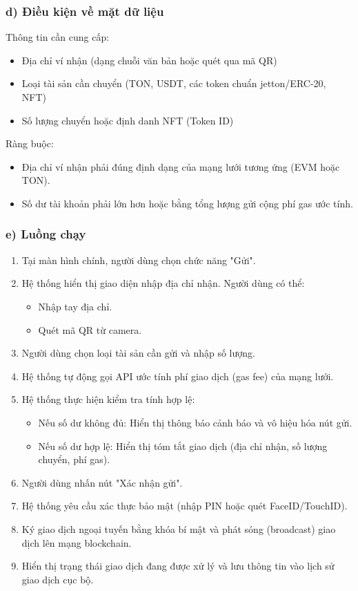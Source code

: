 \documentclass[a4paper]{report}
\begin{document}
\subsubsection{d) Điều kiện về mặt dữ liệu}
Thông tin cần cung cấp:
\begin{itemize}
    \item Địa chỉ ví nhận (dạng chuỗi văn bản hoặc quét qua mã QR)
    \item Loại tài sản cần chuyển (TON, USDT, các token chuẩn jetton/ERC-20, NFT)
    \item Số lượng chuyển hoặc định danh NFT (Token ID)
\end{itemize}

Ràng buộc:
\begin{itemize}
    \item Địa chỉ ví nhận phải đúng định dạng của mạng lưới tương ứng (EVM hoặc TON).
    \item Số dư tài khoản phải lớn hơn hoặc bằng tổng lượng gửi cộng phí gas ước tính.
\end{itemize}

\subsubsection{e) Luồng chạy}
\begin{enumerate}
    \item Tại màn hình chính, người dùng chọn chức năng "Gửi".
    \item Hệ thống hiển thị giao diện nhập địa chỉ nhận. Người dùng có thể:
    \begin{itemize}
        \item Nhập tay địa chỉ.
        \item Quét mã QR từ camera.
    \end{itemize}
    \item Người dùng chọn loại tài sản cần gửi và nhập số lượng.
    \item Hệ thống tự động gọi API ước tính phí giao dịch (gas fee) của mạng lưới.
    \item Hệ thống thực hiện kiểm tra tính hợp lệ:
    \begin{itemize}
        \item Nếu số dư không đủ: Hiển thị thông báo cảnh báo và vô hiệu hóa nút gửi.
        \item Nếu số dư hợp lệ: Hiển thị tóm tắt giao dịch (địa chỉ nhận, số lượng chuyển, phí gas).
    \end{itemize}
    \item Người dùng nhấn nút "Xác nhận gửi".
    \item Hệ thống yêu cầu xác thực bảo mật (nhập PIN hoặc quét FaceID/TouchID).
    \item Ký giao dịch ngoại tuyến bằng khóa bí mật và phát sóng (broadcast) giao dịch lên mạng blockchain.
    \item Hiển thị trạng thái giao dịch đang được xử lý và lưu thông tin vào lịch sử giao dịch cục bộ.
\end{enumerate}
\end{document}
